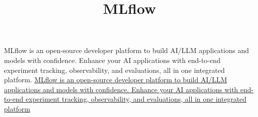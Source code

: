\documentclass[a4paper]{article}
\title{MLflow}
\date{}
\begin{document}
    \maketitle
    MLflow is an open-source developer platform to build AI/LLM applications and models with confidence. Enhance your AI applications with end-to-end experiment tracking, observability, and evaluations, all in one integrated platform.
    \url{MLflow is an open-source developer platform to build AI/LLM applications and models with confidence. Enhance your AI applications with end-to-end experiment tracking, observability, and evaluations, all in one integrated platform}
\end{document}
